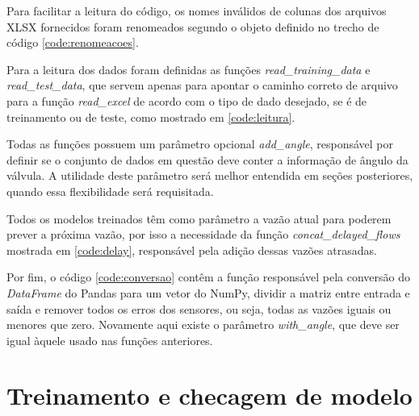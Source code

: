 \documentclass[12pt]{article}
\begin{document}


Para facilitar a leitura do código, os nomes inválidos de colunas dos arquivos XLSX fornecidos foram renomeados segundo o objeto definido no trecho de código \ref{code:renomeacoes}.



Para a leitura dos dados foram definidas as funções \textit{read\_training\_data} e \textit{read\_test\_data}, que servem apenas para apontar o caminho correto de arquivo para a função \textit{read\_excel} de acordo com o tipo de dado desejado, se é de treinamento ou de teste, como mostrado em \ref{code:leitura}.

Todas as funções possuem um parâmetro opcional \textit{add\_angle}, responsável por definir se o conjunto de dados em questão deve conter a informação de ângulo da válvula. A utilidade deste parâmetro será melhor entendida em seções posteriores, quando essa flexibilidade será requisitada.



Todos os modelos treinados têm como parâmetro a vazão atual para poderem prever a próxima vazão, por isso a necessidade da função \textit{concat\_delayed\_flows} mostrada em \ref{code:delay}, responsável pela adição dessas vazões atrasadas.



Por fim, o código \ref{code:conversao} contêm a função responsável pela conversão do \textit{DataFrame} do Pandas para um vetor do NumPy, dividir a matriz entre entrada e saída e remover todos os erros dos sensores, ou seja, todas as vazões iguais ou menores que zero.
Novamente aqui existe o parâmetro \textit{with\_angle}, que deve ser igual àquele usado nas funções anteriores.

\section{Treinamento e checagem de modelo}


\end{document}
